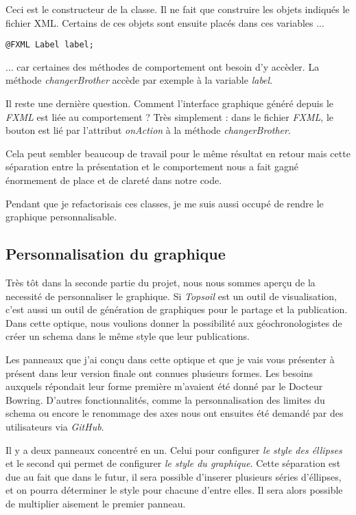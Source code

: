 Ceci est le constructeur de la classe. Il ne fait que construire les objets indiqués le fichier XML. Certains de ces objets sont ensuite placés dans ces variables ...
\begin{verbatim}
@FXML Label label;
\end{verbatim}
... car certaines des méthodes de comportement ont besoin d'y accèder. La méthode \textit{changerBrother} accède par exemple à la variable \textit{label}.

Il reste une dernière question. Comment l'interface graphique généré depuis le \textit{FXML} est liée au comportement ? Très simplement : dans le fichier \textit{FXML}, le bouton est lié par l'attribut \textit{onAction} à la méthode \textit{changerBrother}.

Cela peut sembler beaucoup de travail pour le même résultat en retour mais cette séparation entre la présentation et le comportement nous a fait gagné énormement de place et de clareté dans notre code.

Pendant que je refactorisais ces classes, je me suis aussi occupé de rendre le graphique personnalisable.

\subsection{Personnalisation du graphique}
Très tôt dans la seconde partie du projet, nous nous sommes aperçu de la necessité de personnaliser le graphique. Si \textit{Topsoil} est un outil de visualisation, c'est aussi un outil de génération de graphiques pour le partage et la publication. Dans cette optique, nous voulions donner la possibilité aux géochronologistes de créer un schema dans le même style que leur publications.

Les panneaux que j'ai conçu dans cette optique et que je vais vous présenter à présent dans leur version finale ont connues plusieurs formes. Les besoins auxquels répondait leur forme première m'avaient été donné par le Docteur Bowring. D'autres fonctionnalités, comme la personnalisation des limites du schema ou encore le renommage des axes nous ont ensuites été demandé par des utilisateurs via \textit{GitHub}.


Il y a deux panneaux concentré en un. Celui pour configurer \emph{le style des éllipses} et le second qui permet de configurer \emph{le style du graphique}. Cette séparation est due au fait que dans le futur, il sera possible d'inserer plusieurs séries d'éllipses, et on pourra déterminer le style pour chacune d'entre elles. Il sera alors possible de multiplier aisement le premier panneau.

